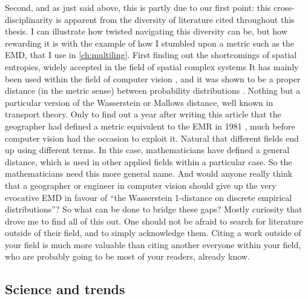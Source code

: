 \documentclass[../thesis.tex]{subfiles}
\begin{document}
Second, and as just said above, this is partly due to our first point: this
cross-disciplinarity is apparent from the diversity of literature cited throughout this
thesis. I can illustrate how twisted navigating this diversity can be, but how rewarding
it is with the example of how I stumbled upon a metric such as the \ac{EMD}, that I use
in \cref{ch:multiling}.
First finding out the shortcomings of spatial entropies, widely accepted in the field of
spatial complex systems \cite{BattyEntropyComplexity2014} It has mainly been used within
the field of computer vision \cite{RubnerMetricDistributions1998}, and it was shown to
be a proper distance (in the metric sense) between probability distributions
\cite{LevinaEarthMover2001}. Nothing but a particular version of the Wasserstein or
Mallows distance, well known in transport theory. Only to find out a year after writing
this article that the geographer
 had defined a metric equivalent
to the \ac{EMR} in 1981 \cite{JakubsDistancebasedSegregation1981}, much before computer
vision had the occasion to exploit it. Natural that different fields end up using
different terms. In this case, mathematicians have defined a general distance, which is
used in other applied fields within a particular case. So the mathematicians need this
more general name. And would anyone really think that a geographer or engineer in
computer vision should give up the very evocative \ac{EMD} in favour of ``the
Wasserstein 1-distance on discrete empirical distributions''? So what can be done to
bridge these gaps? Mostly curiosity that drove me to find all of this out. One should
not be afraid to search for literature outside of their field, and to simply acknowledge
them. Citing a work outside of your field is much more valuable than citing another
everyone within your field, who are probably going to be most of your readers, already
know.


\subsection{Science and trends}
\end{document}
